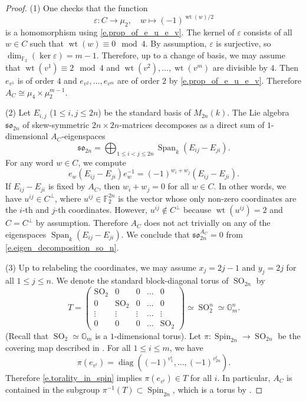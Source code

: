 \documentclass[12pt]{amsart}
\numberwithin{equation}{section}
\theoremstyle{remark}
\newcommand{\eps}{\varepsilon}
\newcommand{\wt}{\operatorname{wt}}
\newcommand{\SO}{\operatorname{SO}}
\newcommand{\Spin}{\operatorname{Spin}}
\newcommand{\diag}{\operatorname{diag}}
\newcommand{\Span}{\operatorname{Span}}
\newcommand{\bF}{\mathbb{F}}
\begin{document}
\begin{proof}
    (1) One checks that the function $$\eps\colon C\to \mu_2,\quad w\mapsto (-1)^{\wt(w)/2}$$ is a homomorphism using \eqref{e.prop_of_e_u_e_v}. The kernel of $\eps$ consists of all $w\in C$ such that $\wt(w) \equiv 0\mod 4$. By assumption, $\eps$ is surjective, so $\dim_{\bF_2}(\ker\eps) = m-1$. Therefore, up to a change of basis, we may assume that $\wt(v^1)\equiv 2 \mod 4$ and $\wt(v^2),\dots,\wt(v^m)$ are divisible by $4$.  Then $e_{v^1}$ is of order $4$ and $e_{v^2},\dots,e_{v^m}$ are of order $2$ by  \eqref{e.prop_of_e_u_e_v}. Therefore $A_C\cong \mu_4\times \mu_2^{m-1}$.

    \smallskip
    (2) Let $E_{i,j}$ ($1\leqslant i,j\leqslant 2n$) be the standard basis of $M_{2n}(k)$. The Lie algebra $\mathfrak{so}_{2n}$ of skew-symmetric $2n \times 2n$-matrices  decomposes as a direct sum of $1$-dimensional $A_C$-eigenspaces \begin{equation}\label{e.eigen_decomposition_so_n}
    \mathfrak{so}_{2n} = \bigoplus_{1\leqslant i<j\leqslant 2n} \Span_k (E_{ij}- E_{ji}).
    \end{equation}
    For any word $w\in C$, we compute
    $$e_{w}(E_{ij}- E_{ji})e_w^{-1}  = (-1)^{w_i +w_j}(E_{ij}- E_{ji}).$$
    If $E_{ij}- E_{ji}$ is fixed by $A_C$, then $w_i+w_j = 0$ for all $w\in C$. In other words, we have $u^{ij} \in C^{\perp}$, where $u^{ij}\in \bF_2^{2n}$ is the vector whose only non-zero coordinates are the $i$-th and $j$-th coordinates. However, $u^{ij} \not\in C^{\perp}$ because $\wt(u^{ij}) = 2$ and $C = C^{\perp}$ by assumption. Therefore $A_C$ does not act trivially on any of the eigenspaces $\Span_k (E_{ij}-E_{ji})$. We conclude that $\mathfrak{so}_{2n}^{A_C} = 0$ from \eqref{e.eigen_decomposition_so_n}. 

    \smallskip
    (3) Up to relabeling the coordinates, we may assume $x_j = 2j-1$ and $y_j = 2j$ for all $1\leqslant j\leqslant n$. We denote the standard block-diagonal torus of $\SO_{2n}$ by 
$$ T = \begin{pmatrix}
     \SO_2 & 0 & 0 & \ldots & 0 \\
     0 & \SO_2 & 0 & \ldots & 0 \\
     \vdots & \vdots & \vdots & \ldots & \vdots \\
       0 & 0 & 0 & \ldots & \SO_2 
 \end{pmatrix} \simeq \SO_2^n \simeq \mathbb G_m^n.$$   
(Recall that $\SO_2 \simeq \mathbb G_m$ is a $1$-dimensional torus). Let $\pi\colon \Spin_{2n}\to \SO_{2n}$ be the covering map described in \cite[Page 279]{wood}. For all $1\leqslant i\leqslant m$, we have $$\pi(e_{v^i}) = \diag((-1)^{v^i_1},\dots,(-1)^{v^i_{2n}}).$$
    Therefore \eqref{e.torality_in_spin} implies $\pi(e_{v^i}) \in T$ for all $i$. In particular, $A_C$ is contained in the subgroup $\pi^{-1}(T)\subset \Spin_{2n}$, which is a torus by \cite[Proposition 11.14]{borel_lag}.
\end{proof}
\end{document}
